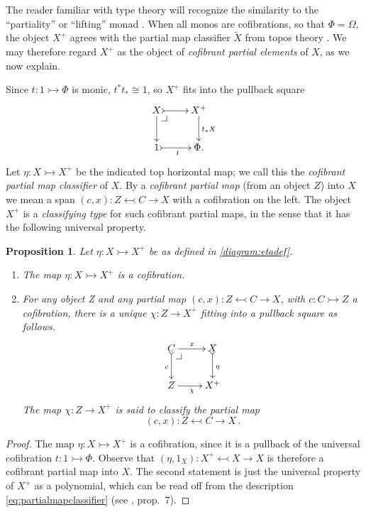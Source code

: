 \documentclass[11pt,reqno]{amsart}
\makeatletter
\newcommand{\mono}{\ensuremath{\rightarrowtail}}
\newcommand{\ra}{\ensuremath{\rightarrow}}
\newcommand{\cof}{\ensuremath{\rightarrowtail}}
\newtheorem{proposition}[theorem]{Proposition}
\theoremstyle{remark}
\theoremstyle{definition}
\newcommand{\pbcorner}[1][dr]{\save*!/#1-1.2pc/#1:(-1,1)@^{|-}\restore}
\makeatother
\begin{document}
The reader familiar with type theory will recognize the similarity to the ``partiality'' or ``lifting''  monad \cite{Moggi:91}.  When all monos are cofibrations, so that $\Phi = \Omega$, the object $X^+$ agrees with the partial map classifier $\widetilde{X}$ from topos theory \cite{JohnstoneTT}.  We may therefore regard $X^+$ as the object of \emph{cofibrant partial elements} of $X$, as we now explain.

Since $t: 1\cof \Phi$ is monic, $t^*t_*\cong 1$, so $X^+$ fits into the  pullback square
\begin{equation}\label{diagram:etadef}
\xymatrix{
X \ar[d]\pbcorner \ar@{>->}[r] & X^+ \ar[d]^{t_*X}\\
1 \ar@{>->}[r]_{t} & \Phi.
}
\end{equation}
Let $\eta : X\mono X^+$ be the indicated top horizontal map; we call this the \emph{cofibrant partial map classifier} of $X$.  By a \emph{cofibrant partial map} (from an object $Z$) into $X$ we mean a span $(c,x): Z\leftarrowtail C\ra X$ with a cofibration on the left.  The object $X^+$ is a \emph{classifying type} for such cofibrant partial maps, in the sense that it has the following universal property.
 
\begin{proposition}\label{prop:cofparclass}
Let $\eta : X\mono X^+$ be as defined in \eqref{diagram:etadef}. 
\begin{enumerate}
\item The map $\eta : X\mono X^+$ is a cofibration.
\item For any object Z and any partial map $(c,x): Z\leftarrowtail C\ra X$, with $c : C\mono Z$ a cofibration, there is a unique $\chi : Z\ra X^+$ fitting into a pullback square as follows.
\[
\xymatrix{
C \ar@{>->}[d]_{c} \pbcorner \ar[r]^x & X \ar@{>->}[d]^{\eta}\\
Z \ar[r]_\chi & X^+
}
\]
The map $\chi : Z\ra X^+$ is said to \emph{classify} the partial map 
\[
(c,x): Z\leftarrowtail C\ra X\,.
\]
\end{enumerate}
\end{proposition}

\begin{proof}
The map $\eta : X\mono X^+$ is a cofibration, since it is a pullback of the universal cofibration $t : 1\cof \Phi$. Observe that $(\eta, 1_X) : X^+\leftarrowtail X\ra X$ is therefore a cofibrant partial map into $X$.  The second statement is just the universal property of $X^+$ as a polynomial, which can be read off from the description \eqref{eq:partialmapclassifier} (see \cite{A:natural}, prop.~7). 
\end{proof}
\end{document}
